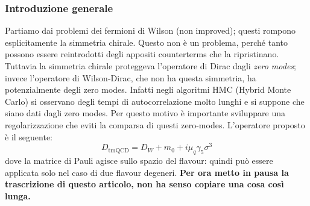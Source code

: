 \documentclass[12pt,a4paper,openright]{article}
\newcommand{\colg}{\textcolor{PineGreen}}
\newcommand{\colr}{\textcolor{BrickRed}}
\begin{document}
\subsubsection*{Introduzione generale}
Partiamo dai problemi dei fermioni di Wilson (non improved); questi rompono esplicitamente la simmetria chirale.
Questo non è un problema, perché tanto possono essere reintrodotti degli appositi counterterms che la ripristinano.
Tuttavia la simmetria chirale proteggeva l'operatore di Dirac dagli \textit{zero modes}; invece l'operatore di Wilson-Dirac, che non ha questa simmetria, ha potenzialmente degli zero modes.
\colg{Infatti negli algoritmi HMC (Hybrid Monte Carlo) si osservano degli tempi di autocorrelazione molto lunghi e si suppone che siano dati dagli zero modes.}
Per questo motivo è importante sviluppare una regolarizzazione che eviti la comparsa di questi zero-modes.
\newline
L'operatore proposto è il seguente:
\begin{equation}\label{eq:twisted-mass-operator}
  D_{\text{tmQCD}} = D_W + m_0 + i\mu_q \gamma_5 \sigma^3
\end{equation}
dove la matrice di Pauli agisce sullo spazio del flavour: quindi può essere applicata solo nel caso di due flavour degeneri.
\newline
\newline
\colr{\bf Per ora metto in pausa la trascrizione di questo articolo, non ha senso copiare una cosa così lunga.}


\newpage
\end{document}

